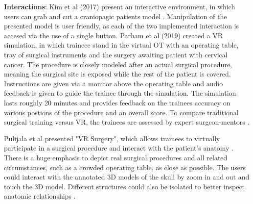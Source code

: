 \textbf{Interactions}: Kim et al (2017) present an interactive environment, in which users can grab and cut a craniopagic patients model \cite{.2017}.
Manipulation of the presented model is user friendly, as each of the two implemented interaction is accesed via the use of a single button.
\newline
Parham et al (2019) created a VR simulation, in which traineee stand in the virtual OT with an operating table, tray of surgical instruments and the surgery awaiting patient with cervical cancer.
The procedure is closely modeled after an actual surgical procedure, meaning the surgical site is exposed while the rest of the patient is covered.
Instructions are given via a monitor above the operating table and audio feedback is given to guide the trainee through the simulation.
The simulation lasts roughly 20 minutes and provides feedback on the trainees accuracy on various postions of the procedure and an overall score.
To compare traditional surgical training versus VR, the trainees are assessed by expert surgeon-mentors \cite{RN52}.

Pulijala et al \cite{Pulijala.2017} presented "VR Surgery", which allows trainees to virtually participate in a surgical procedure and interact with the patient's anatomy \cite{RN6}.
There is a huge emphasis to depict real surgical procedures and all related circumstances, such as a crowded operating table, as close as possible.
The users could interact with the annotated 3D models of the skull by zoom in and out and touch the 3D model.
Different structures could also be isolated to better inspect anatomic relationships \cite{Pulijala.2017}.
